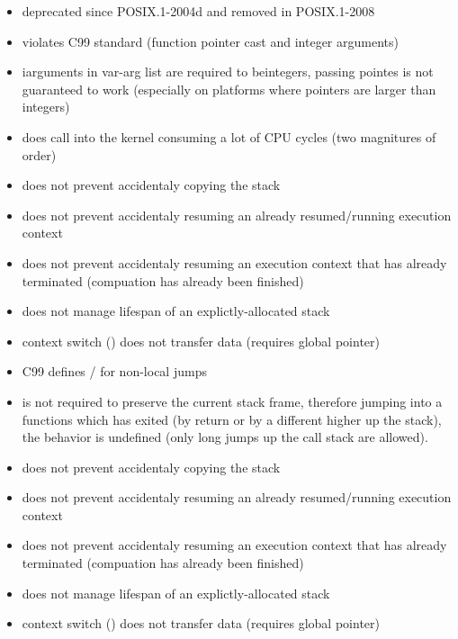 
\begin{itemize}
    \item deprecated since POSIX.1-2004d and removed in POSIX.1-2008
    \item {} violates C99 standard (function pointer cast and integer arguments)
    \item {} iarguments in var-arg list are required to beintegers, passing pointes
        is not guaranteed to work (especially on platforms where pointers are larger than integers)
    \item {} does call into the kernel consuming a lot of CPU cycles (two magnitures
        of order)
    \item does not prevent accidentaly copying the stack
    \item does not prevent accidentaly resuming an already resumed/running execution
        context
    \item does not prevent accidentaly resuming an execution context that has already
        terminated (compuation has already been finished)
    \item does not manage lifespan of an explictly-allocated stack
    \item context switch () does not transfer data (requires global pointer)
\end{itemize}


\begin{itemize}
    \item C99 defines \sj / \lj for non-local jumps
    \item \lj is not required to preserve the current stack frame, therefore jumping into a functions
        which has exited (by return or by a different \lj higher up the stack), the behavior is undefined
        (only long jumps up the call stack are allowed).
    \item does not prevent accidentaly copying the stack
    \item does not prevent accidentaly resuming an already resumed/running execution
        context
    \item does not prevent accidentaly resuming an execution context that has already
        terminated (compuation has already been finished)
    \item does not manage lifespan of an explictly-allocated stack
    \item context switch (\lj) does not transfer data (requires global pointer)
\end{itemize}
